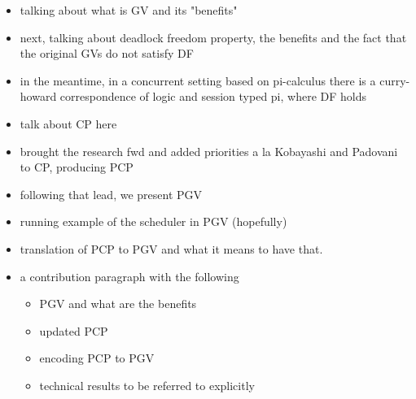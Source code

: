 \documentclass[main.tex]{subfiles}
\begin{document}
\begin{itemize}
\item talking about what is GV and its "benefits"
\item next, talking about deadlock freedom property, the benefits and the fact that the original GVs do not satisfy DF
\item in the meantime, in a concurrent setting based on pi-calculus there is a curry-howard correspondence of logic and session typed pi, where DF holds
\item talk about CP here
\item \cite{dardhagay18} brought the research fwd and added priorities a la Kobayashi and Padovani to CP, producing PCP
\item following that lead, we present PGV
\item running example of the scheduler in PGV (hopefully)
\item translation of PCP to PGV and what it means to have that.
\item a contribution paragraph with the following
  \begin{itemize}
  \item PGV and what are the benefits
  \item updated PCP
  \item encoding PCP to PGV
  \item technical results to be referred to explicitly
  \end{itemize}
\end{itemize}
\end{document}
